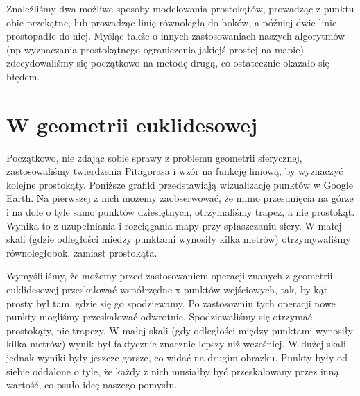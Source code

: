 Znaleźliśmy dwa możliwe sposoby modelowania prostokątów, prowadząc z punktu obie przekątne, lub
prowadząc linię równoległą do boków, a później dwie linie prostopadłe do niej. Myśląc także o
innych zastosowaniach naszych algorytmów (np wyznaczania prostokątnego ograniczenia jakiejś
prostej na mapie) zdecydowaliśmy się początkowo na metodę drugą, co ostatecznie okazało się błędem.

\section{W geometrii euklidesowej}\label{sec:geolocalisation_euclidean}

Początkowo, nie zdając sobie sprawy z problemu geometrii sferycznej, zastosowaliśmy twierdzenia
Pitagorasa i wzór na funkcję liniową, by wyznaczyć kolejne prostokąty. Poniższe grafiki przedstawiają
wizualizację punktów w Google Earth. Na pierwszej z nich możemy zaobserwować, że mimo przesunięcia
na górze i na dole o tyle samo punktów dziesiętnych, otrzymaliśmy trapez, a nie prostokąt. Wynika
to z uzupełniania i rozciągania mapy przy spłaszczaniu sfery. W małej skali (gdzie odległości miedzy
punktami wynosiły kilka metrów) otrzymywaliśmy równoległobok, zamiast prostokąta.

Wymyśliliśmy, że możemy przed zastosowaniem operacji znanych z geometrii euklidesowej przeskalować
współrzędne x punktów wejściowych, tak, by kąt prosty był tam, gdzie się go spodziewamy. Po
zastosowniu tych operacji nowe punkty mogliśmy przeskalować odwrotnie. Spodziewaliśmy się
otrzymać prostokąty, nie trapezy. W małej skali (gdy odległości między punktami wynosiły kilka metrów)
wynik był faktycznie znacznie lepszy niż wcześniej. W dużej skali jednak wyniki były jeszcze gorsze, co
widać na drugim obrazku. Punkty były od siebie oddalone o tyle, że każdy z nich musiałby być przeskalowany
przez inną wartość, co psuło ideę naszego pomysłu.

